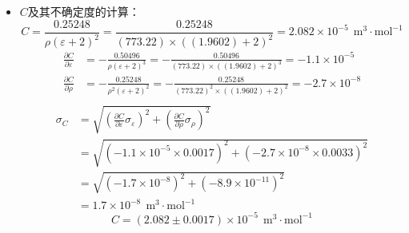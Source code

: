 \documentclass[cn,hazy,pku,12pt,normal,math=newtx,cite=super]{elegantnote}
\begin{document}
\begin{itemize}
\item $C$及其不确定度的计算：
\begin{equation*}
C=\frac{0.25248}{\rho \left(\varepsilon + 2\right)^{2}}=\frac{0.25248}{\left(773.22\right) \times \left(\left(1.9602\right) + 2\right)^{2}}=2.082 \times 10^{-5}\ \mathrm{~m^3\cdot mol^{-1}}
\end{equation*}
\begin{equation*}
\begin{aligned}
\frac{\partial C }{\partial \varepsilon }&=- \frac{0.50496}{\rho \left(\varepsilon + 2\right)^{3}}=- \frac{0.50496}{\left(773.22\right) \times \left(\left(1.9602\right) + 2\right)^{3}}=-1.1 \times 10^{-5}\\
\frac{\partial C }{\partial \rho }&=- \frac{0.25248}{\rho^{2} \left(\varepsilon + 2\right)^{2}}=- \frac{0.25248}{\left(773.22\right)^{2} \times \left(\left(1.9602\right) + 2\right)^{2}}=-2.7 \times 10^{-8}\\
\end{aligned}
\end{equation*}
\begin{equation*}
\begin{aligned}
\sigma_{C}&=\sqrt{\left(\frac{\partial C }{\partial \varepsilon } \sigma_{\varepsilon}\right)^2+\left(\frac{\partial C }{\partial \rho } \sigma_{\rho}\right)^2}\\
&=\sqrt{\left(-1.1 \times 10^{-5} \times 0.0017\right)^2+\left(-2.7 \times 10^{-8} \times 0.0033\right)^2}\\
&=\sqrt{\left(-1.7 \times 10^{-8}\right)^2+\left(-8.9 \times 10^{-11}\right)^2}\\
&=1.7 \times 10^{-8}\ \mathrm{~m^3\cdot mol^{-1}}
\end{aligned}
\end{equation*}
\begin{equation*}
C=(2.082  \pm 0.0017) \times 10^{-5}\ \mathrm{~m^3\cdot mol^{-1}}
\end{equation*}
\end{itemize}
\end{document}
